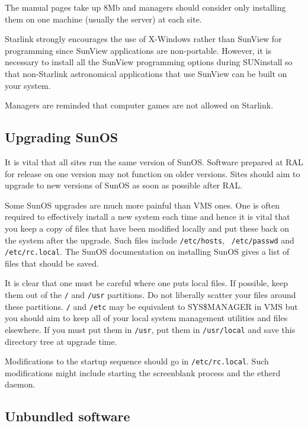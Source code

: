 The manual pages take up 8Mb and managers should consider only installing
them on one machine (usually the server) at each site.

Starlink strongly encourages the use of X-Windows rather than SunView for programming
since SunView applications are non-portable. However, it is necessary to
install all the SunView programming options during SUNinstall so that
non-Starlink astronomical applications that use SunView can be built on your
system.

Managers are reminded that computer games are not allowed on Starlink.


\subsection {Upgrading SunOS}

It is vital that all sites run the same version of SunOS. Software prepared
at RAL for release on one version may not function on older versions.
Sites should aim to upgrade to new versions of SunOS as soon as
possible after RAL.

Some SunOS upgrades are much more painful than VMS ones. One is often required
to  effectively install a new system each time and hence it is vital that  you
keep a copy of files that have been modified locally and put these back on the
system after the upgrade. Such files include {\tt /etc/hosts}, {\tt
/etc/passwd} and {\tt /etc/rc.local}. The SunOS documentation on installing
SunOS gives a list of files that should be saved.

It is clear that one must be careful where one puts local files. If
possible, keep them out of the {\tt /} and {\tt /usr} partitions. Do not liberally scatter
your files around these partitions. {\tt /} and {\tt /etc} may be equivalent to
SYS\$MANAGER in VMS but you should aim to keep all of your local system
management utilities and files elsewhere. If you must put them in {\tt /usr}, put
them in {\tt /usr/local} and save this directory tree at upgrade time.

Modifications to the startup sequence should go in {\tt /etc/rc.local}. Such
modifications might include starting the screenblank process and the etherd
daemon.


\subsection{Unbundled software}

